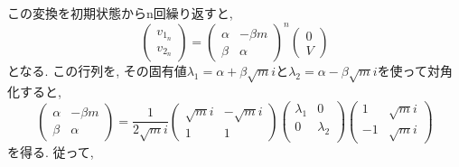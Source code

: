 \documentclass[lualatex,a5paper,ja=standard]{bxjsarticle}
\begin{document}
この変換を初期状態からn回繰り返すと, 
\begin{equation}
    \begin{pmatrix}
        v_{1_n}\\
        v_{2_n}
    \end{pmatrix}
        =
    \begin{pmatrix}
        \alpha & -\beta m\\
        \beta & \alpha
    \end{pmatrix}^n
    \begin{pmatrix}
        0\\
        V
    \end{pmatrix}
\end{equation}
となる. この行列を, その固有値$\lambda_1 = \alpha + \beta \sqrt{m} i$と$\lambda_2 = \alpha - \beta \sqrt{m} i$を使って対角化すると, 
\begin{equation}
\begin{pmatrix}
    \alpha & -\beta m\\
    \beta & \alpha
\end{pmatrix}=\frac{1}{2\sqrt{m}i}\begin{pmatrix}
    \sqrt{m}i & -\sqrt{m}i\\
    1 & 1
\end{pmatrix}\begin{pmatrix}
    \lambda_1 & 0 \\
    0 & \lambda_2 \\
\end{pmatrix}\begin{pmatrix}
    1 & \sqrt{m}i\\
    -1 & \sqrt{m}i
\end{pmatrix}
\end{equation}を得る. 従って, 
\end{document}
